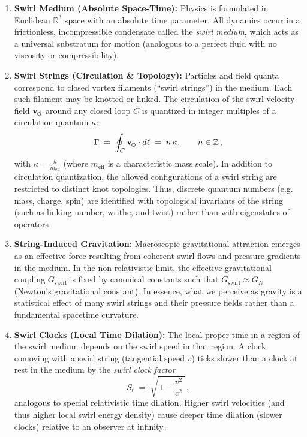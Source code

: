 \documentclass[reprint,aps,onecolumn,nofootinbib]{revtex4-2}
\newcommand{\swirlarrow}{%
    \mathchoice{\mkern-2mu\scriptstyle\boldsymbol{\circlearrowleft}}%
    {\mkern-2mu\scriptstyle\boldsymbol{\circlearrowleft}}%
    {\mkern-2mu\scriptscriptstyle\boldsymbol{\circlearrowleft}}%
    {\mkern-2mu\scriptscriptstyle\boldsymbol{\circlearrowleft}}%
}
\newcommand{\vswirl}{\mathbf{v}_{\swirlarrow}}
\begin{document}
	\begin{enumerate}\itemsep 4pt
	\item \textbf{Swirl Medium (Absolute Space-Time):} Physics is formulated in Euclidean $\mathbb{R}^3$ space with an absolute time parameter. All dynamics occur in a frictionless, incompressible condensate called the \emph{swirl medium}, which acts as a universal substratum for motion (analogous to a perfect fluid with no viscosity or compressibility).
	\item \textbf{Swirl Strings (Circulation \& Topology):} Particles and field quanta correspond to closed vortex filaments (“swirl strings”) in the medium. Each such filament may be knotted or linked. The circulation of the swirl velocity field $\vswirl$ around any closed loop $C$ is quantized in integer multiples of a circulation quantum $\kappa$:
	\[
		\Gamma \;=\; \oint_{C} \vswirl \cdot d\ell \;=\; n\,\kappa, \qquad n\in \mathbb{Z}\,,
	\]
	with $\displaystyle \kappa = \frac{h}{m_{\mathrm{eff}}}$ (where $m_{\mathrm{eff}}$ is a characteristic mass scale). In addition to circulation quantization, the allowed configurations of a swirl string are restricted to distinct knot topologies. Thus, discrete quantum numbers (e.g. mass, charge, spin) are identified with topological invariants of the string (such as linking number, writhe, and twist) rather than with eigenstates of operators.
	\item \textbf{String-Induced Gravitation:} Macroscopic gravitational attraction emerges as an effective force resulting from coherent swirl flows and pressure gradients in the medium. In the non-relativistic limit, the effective gravitational coupling $G_{\text{swirl}}$ is fixed by canonical constants such that $G_{\text{swirl}} \approx G_N$ (Newton’s gravitational constant). In essence, what we perceive as gravity is a statistical effect of many swirl strings and their pressure fields rather than a fundamental spacetime curvature.
	\item \textbf{Swirl Clocks (Local Time Dilation):} The local proper time in a region of the swirl medium depends on the swirl speed in that region. A clock comoving with a swirl string (tangential speed $v$) ticks slower than a clock at rest in the medium by the \emph{swirl clock factor}
	\[
		S_t \;=\; \sqrt{\,1 - \frac{v^2}{c^2}\,}\,,
	\]
	analogous to special relativistic time dilation. Higher swirl velocities (and thus higher local swirl energy density) cause deeper time dilation (slower clocks) relative to an observer at infinity.

\end{enumerate}
\end{document}
